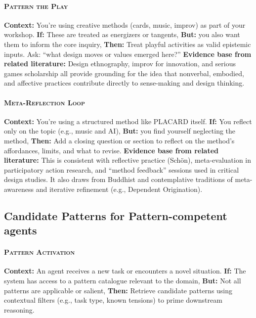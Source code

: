 \documentclass[acmlarge,timestamp]{acmart}
\begin{document}
{\paragraph*{{\scshape Pattern the Play}}

\noindent \textbf{Context:} You’re using creative methods (cards, music, improv) as part of your workshop.
\textbf{If:} These are treated as energizers or tangents,  \textbf{But:} you also want them to inform the core inquiry,
\textbf{Then:} Treat playful activities as valid epistemic inputs. Ask: “what design moves or values emerged here?”
\textbf{Evidence base from related literature:} Design ethnography, improv for innovation, and serious games scholarship all provide grounding for the idea that nonverbal, embodied, and affective practices contribute directly to sense-making and design thinking.

\paragraph*{{\scshape Meta-Reflection Loop}}

\noindent \textbf{Context:} You’re using a structured method like PLACARD itself.
\textbf{If:} You reflect only on the topic (e.g., music and AI), \textbf{But:} you find yourself neglecting the method,
\textbf{Then:} Add a closing question or section to reflect on the method’s affordances, limits, and what to revise.
\textbf{Evidence base from related literature:} This is consistent with reflective practice (Schön), meta-evaluation in participatory action research, and “method feedback” sessions used in critical design studies. It also draws from Buddhist and contemplative traditions of meta-awareness and iterative refinement (e.g., Dependent Origination).

\subsection*{Candidate Patterns for Pattern-competent agents}

\paragraph*{{\scshape Pattern Activation}}

\noindent \textbf{Context:} An agent receives a new task or encounters a novel situation.
 \textbf{If:} The system has access to a pattern catalogue relevant to the domain,
 \textbf{But:} Not all patterns are applicable or salient,
 \textbf{Then:} Retrieve candidate patterns using contextual filters (e.g., task type, known tensions) to prime downstream reasoning.

}
\end{document}
